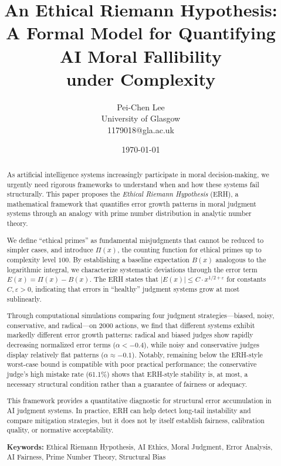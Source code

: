 \documentclass[12pt,a4paper]{article}
\title{An Ethical Riemann Hypothesis:\\
       A Formal Model for Quantifying AI Moral Fallibility\\
       under Complexity}
\author{Pei-Chen Lee \\
        University of Glasgow \\
        1179018@gla.ac.uk}
\date{\today}
\theoremstyle{definition}
\theoremstyle{remark}
\begin{document}
\maketitle

\begin{abstract}
\sloppy
As artificial intelligence systems increasingly participate in moral decision-making, we urgently need rigorous frameworks to understand when and how these systems fail structurally. This paper proposes the \emph{Ethical Riemann Hypothesis} (ERH), a mathematical framework that quantifies error growth patterns in moral judgment systems through an analogy with prime number distribution in analytic number theory.

We define ``ethical primes'' as fundamental misjudgments that cannot be reduced to simpler cases, and introduce $\Pi(x)$, the counting function for ethical primes up to complexity level $100$. By establishing a baseline expectation $B(x)$ analogous to the logarithmic integral, we characterize systematic deviations through the error term $E(x) = \Pi(x) - B(x)$. The ERH states that $|E(x)| \leq C \cdot x^{1/2 + \varepsilon}$ for constants $C, \varepsilon > 0$, indicating that errors in ``healthy'' judgment systems grow at most sublinearly.

Through computational simulations comparing four judgment strategies---biased, noisy, conservative, and radical---on 2000 actions, we find that different systems exhibit markedly different error growth patterns: radical and biased judges show rapidly decreasing normalized error terms ($\alpha < -0.4$), while noisy and conservative judges display relatively flat patterns ($\alpha \approx -0.1$). Notably, remaining below the ERH-style worst-case bound is compatible with poor practical performance; the conservative judge's high mistake rate (61.1\%) shows that ERH-style stability is, at most, a necessary structural condition rather than a guarantee of fairness or adequacy.

This framework provides a quantitative diagnostic for structural error accumulation in AI judgment systems. In practice, ERH can help detect long-tail instability and compare mitigation strategies, but it does not by itself establish fairness, calibration quality, or normative acceptability.

\textbf{Keywords:} Ethical Riemann Hypothesis, AI Ethics, Moral Judgment, Error Analysis, AI Fairness, Prime Number Theory, Structural Bias
\end{abstract}
\end{document}

